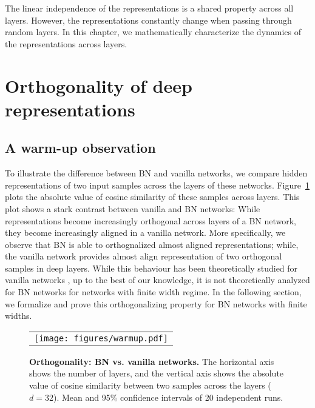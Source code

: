The linear independence of the representations is a shared property across all layers. However, the representations constantly change when passing through random layers. In this chapter, we mathematically characterize the dynamics of the representations across layers. 


\section{Orthogonality of deep representations} \label{ortho:sec:orthogonality}
\subsection{A warm-up observation}
To illustrate the difference between BN and vanilla networks, we compare hidden representations of two input samples across the layers of these networks. Figure~\ref{ortho:fig:orthogonality} plots the absolute value of cosine similarity of these samples across layers. This plot shows a stark contrast between vanilla and BN networks: While representations become increasingly orthogonal across layers of a BN network, they become increasingly aligned in a vanilla network. More specifically, we observe that BN is able to orthognalized almost aligned representations; while, the vanilla network provides almost align representation of two orthogonal samples in deep layers. While this behaviour has been theoretically studied for vanilla networks \citep{daneshmand2020batch,bjorck2018understanding,saxe2013exact}, up to the best of our knowledge, it is not theoretically analyzed for BN networks for networks with finite width regime. In the following section, we formalize and prove this orthogonalizing property for BN networks with finite widths.  
\begin{figure}[!ht]
    \centering
    \begin{tabular}{c}
        \texttt{[image: figures/warmup.pdf]}
    \end{tabular}
    \caption{\textbf{Orthogonality: BN vs. vanilla networks.} The horizontal axis shows the number of layers, and the vertical axis shows the absolute value of cosine similarity between two samples across the layers ($d=32$). Mean and 95\% confidence intervals of 20 independent runs.
    }
    \label{ortho:fig:orthogonality}
\end{figure}

